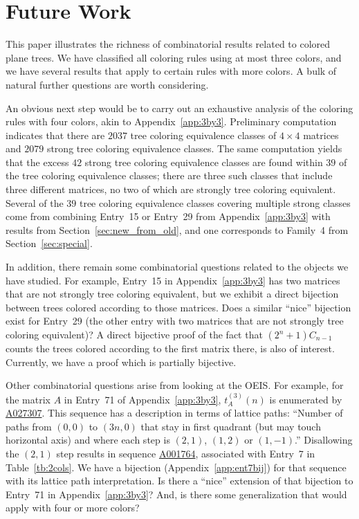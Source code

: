 \documentclass[12pt]{amsart}
\newcommand{\seqnum}[1]{\href{https://oeis.org/#1}{#1}}
\begin{document}
\section{Future Work}\label{sec:future}

This paper illustrates the richness of combinatorial results related to colored plane trees. 
We have classified all coloring rules using at most three colors, and we have several results that apply to certain rules with more colors. A bulk of natural further questions are worth considering.

An obvious next step would be to carry out an exhaustive analysis of the coloring rules with four colors, akin to  Appendix~\ref{app:3by3}. Preliminary computation indicates that there are $2037$ tree coloring equivalence classes of $4\times 4$ matrices and $2079$ strong tree coloring equivalence classes. The same computation yields that the excess $42$ strong tree coloring equivalence classes are found within $39$ of the tree coloring equivalence classes; there are three such classes that include three different matrices, no two of which are strongly tree coloring equivalent. 
Several of the $39$ tree coloring equivalence classes covering multiple strong classes come from combining Entry~15 or Entry~29 from Appendix~\ref{app:3by3} with results from Section~\ref{sec:new_from_old}, and one corresponds to Family~4 from Section~\ref{sec:special}.

In addition, there remain some combinatorial questions related to the objects we have studied. For example, Entry~15 in Appendix~\ref{app:3by3} has two matrices that are not strongly tree coloring equivalent, but we exhibit a direct bijection between trees colored according to those matrices. Does a similar ``nice'' bijection exist for Entry~29 (the other entry with two matrices that are not strongly tree coloring equivalent)? A direct bijective proof of the fact that $(2^{n}+1)C_{n-1}$ counts the trees colored according to the first matrix there, is also of interest. Currently, we have a proof which is partially bijective. 

Other combinatorial questions arise from looking at the OEIS. For example, for the matrix $A$ in Entry~71 of Appendix~\ref{app:3by3}, $t_{A}^{(3)}(n)$ is enumerated by \seqnum{A027307}. This sequence has a description in terms of lattice paths: ``Number of paths from $(0,0)$ to $(3n,0)$ that stay in first quadrant (but may touch horizontal axis) and where each step is $(2,1)$, $(1,2)$ or $(1,-1)$.'' Disallowing the $(2,1)$ step results in sequence \seqnum{A001764}, associated with Entry~7 in Table~\ref{tb:2cols}. We have a bijection (Appendix~\ref{app:ent7bij}) for that sequence with its lattice path interpretation. Is there a ``nice'' extension of that bijection to Entry~71 in Appendix~\ref{app:3by3}? And, is there some generalization that would apply with four or more colors?
\end{document}
